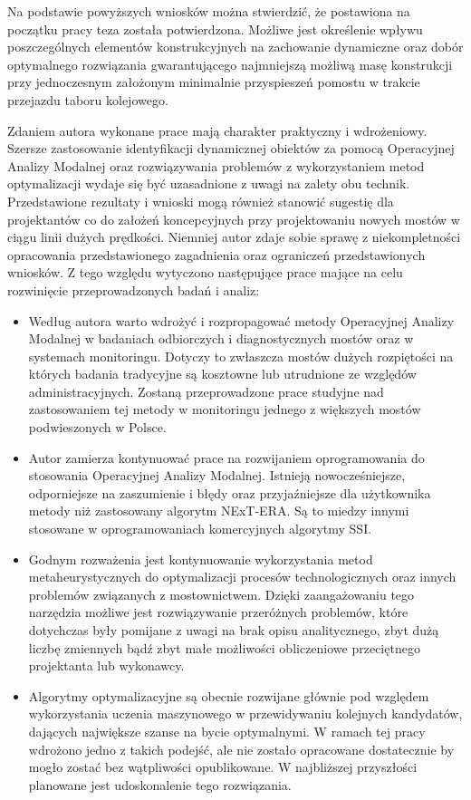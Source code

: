 Na podstawie powyższych wniosków można stwierdzić, że postawiona na początku pracy teza została potwierdzona. Możliwe jest określenie wpływu poszczególnych elementów konstrukcyjnych na zachowanie dynamiczne oraz dobór optymalnego rozwiązania gwarantującego najmniejszą możliwą masę konstrukcji przy jednoczesnym założonym minimalnie przyspieszeń pomostu w trakcie przejazdu taboru kolejowego.

Zdaniem autora wykonane prace mają charakter praktyczny i wdrożeniowy. Szersze zastosowanie identyfikacji dynamicznej obiektów za pomocą Operacyjnej Analizy Modalnej oraz rozwiązywania problemów z wykorzystaniem metod optymalizacji wydaje się być uzasadnione z uwagi na zalety obu technik. Przedstawione rezultaty i wnioski mogą również stanowić sugestię dla projektantów co do założeń koncepcyjnych przy projektowaniu nowych mostów w ciągu linii dużych prędkości. Niemniej autor zdaje sobie sprawę z niekompletności opracowania przedstawionego zagadnienia oraz ograniczeń przedstawionych wniosków. Z tego względu wytyczono następujące prace mające na celu rozwinięcie przeprowadzonych badań i analiz:
\begin{itemize}
	\item Według autora warto wdrożyć i rozpropagować metody Operacyjnej Analizy Modalnej w badaniach odbiorczych i diagnostycznych mostów oraz w systemach monitoringu. Dotyczy to zwłaszcza mostów dużych rozpiętości na których badania tradycyjne są kosztowne lub utrudnione ze względów administracyjnych. Zostaną przeprowadzone prace studyjne nad zastosowaniem tej metody w monitoringu jednego z większych mostów podwieszonych w Polsce.
	\item Autor zamierza kontynuować prace na rozwijaniem oprogramowania do stosowania Operacyjnej Analizy Modalnej. Istnieją nowocześniejsze, odporniejsze na zaszumienie i błędy oraz przyjaźniejsze dla użytkownika metody niż zastosowany algorytm NExT-ERA. Są to miedzy innymi stosowane w oprogramowaniach komercyjnych algorytmy SSI.
	\item Godnym rozważenia jest kontynuowanie wykorzystania metod metaheurystycznych do optymalizacji procesów technologicznych oraz innych problemów związanych z mostownictwem. Dzięki zaangażowaniu tego narzędzia możliwe jest rozwiązywanie przeróżnych problemów, które dotychczas były pomijane z uwagi na brak opisu analitycznego, zbyt dużą liczbę zmiennych bądź zbyt małe możliwości obliczeniowe przeciętnego projektanta lub wykonawcy.
	\item  Algorytmy optymalizacyjne są obecnie rozwijane głównie pod względem wykorzystania uczenia maszynowego w przewidywaniu kolejnych kandydatów, dających największe szanse na bycie optymalnymi. W ramach tej pracy wdrożono jedno z takich podejść, ale nie zostało opracowane dostatecznie by mogło zostać bez wątpliwości opublikowane. W najbliższej przyszłości planowane jest udoskonalenie tego rozwiązania.
\end{itemize}  

